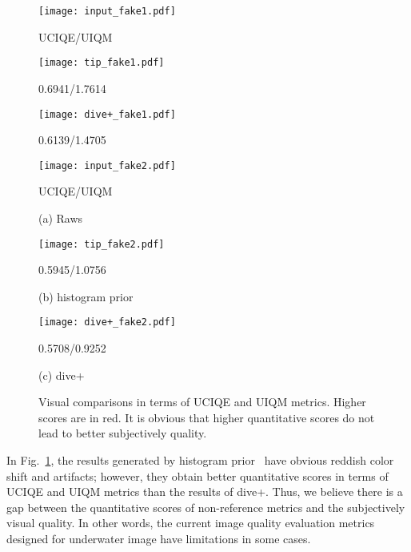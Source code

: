 \documentclass[journal]{IEEEtran}
\begin{document}
\begin{figure}[!htp]
  \centering
\begin{minipage}[b]{0.32\linewidth}
  \centering
  \centerline{\texttt{[image: input\_fake1.pdf]}}
  \centerline{UCIQE/UIQM }\medskip
\end{minipage}
\begin{minipage}[b]{0.32\linewidth}
  \centering
  \centerline{\texttt{[image: tip\_fake1.pdf]}}
  \centerline{{\color{red}0.6941/1.7614}}\medskip
\end{minipage}
\begin{minipage}[b]{0.32\linewidth}
  \centering
  \centerline{\texttt{[image: dive+\_fake1.pdf]}}
  \centerline{0.6139/1.4705}\medskip
\end{minipage}


\begin{minipage}[b]{0.32\linewidth}
  \centering
  \centerline{\texttt{[image: input\_fake2.pdf]}}
  \centerline{UCIQE/UIQM}\medskip
  \centerline{(a) Raws}\medskip
\end{minipage}
\begin{minipage}[b]{0.32\linewidth}
  \centering
  \centerline{\texttt{[image: tip\_fake2.pdf]}}
   \centerline{{\color{red}0.5945/1.0756}}\medskip
     \centerline{(b) histogram prior~\cite{Li2016}}\medskip
\end{minipage}
\begin{minipage}[b]{0.32\linewidth}
  \centering
  \centerline{\texttt{[image: dive+\_fake2.pdf]}}
     \centerline{0.5708/0.9252}\medskip
  \centerline{(c) dive+}\medskip
\end{minipage}
\caption{Visual comparisons in terms of UCIQE and UIQM metrics. Higher scores are in red. It is obvious that higher quantitative scores do not lead to better subjectively quality.}
\label{fig:metric}
\vspace{-5mm}
\end{figure}



In Fig.~\ref{fig:metric}, the results generated by histogram prior~\cite{Li2016} have obvious reddish color shift and artifacts; however, they obtain better quantitative scores in terms of UCIQE and UIQM metrics than the results of dive+. Thus, we believe there is a gap between the quantitative scores of non-reference metrics and the subjectively visual quality. In other words, the current image quality evaluation metrics designed for underwater image have limitations in some cases.
\end{document}
